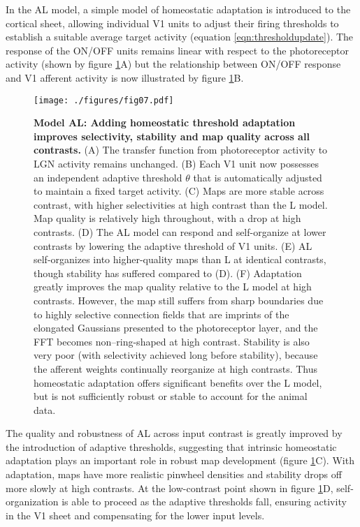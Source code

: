 \documentclass{article}
\def \scalefactor {0.666666}
\def \GaussianScale {\scalefactor}         %
\begin{document}
In the AL model, a simple model of homeostatic adaptation is
introduced to the cortical sheet, allowing individual V1 units to
adjust their firing thresholds to establish a suitable average target
activity (equation \ref{eqn:thresholdupdate}). The response of the
ON/OFF units remains linear with respect to the photoreceptor activity
(shown by figure \ref{fig:gaussian_AL}A) but the relationship between
ON/OFF response and V1 afferent activity is now illustrated by figure
\ref{fig:gaussian_AL}B.
\begin{figure}
\centerline{
\texttt{[image: ./figures/fig07.pdf]}
}

\caption[]{\textbf{Model AL: Adding homeostatic threshold adaptation
    improves selectivity, stability and map quality across all contrasts.} 
  (A) The transfer function from photoreceptor activity to LGN activity
  remains unchanged. (B) Each V1 unit now possesses an independent
  adaptive threshold $\theta$ that is automatically adjusted to
  maintain a fixed target activity. (C) Maps are more stable across
  contrast, with higher selectivities at high contrast than the L
  model. Map quality is relatively high throughout, with a drop at high
  contrasts. (D) The AL model can respond and self-organize at lower
  contrasts by lowering the adaptive threshold of V1 units. (E) AL
  self-organizes into higher-quality maps than L at identical
  contrasts, though stability has suffered compared to (D).  (F)
  Adaptation greatly improves the map quality relative to the L model
  at high contrasts. However, the map still suffers from sharp
  boundaries due to highly selective connection fields that are
  imprints of the elongated Gaussians presented to the photoreceptor
  layer, and the FFT becomes non--ring-shaped at high contrast.
  Stability is also very poor (with selectivity achieved long before
  stability), because the afferent weights continually reorganize at
  high contrasts.  Thus homeostatic adaptation offers significant
  benefits over the L model, but is not sufficiently robust or stable
  to account for the animal data.}
\label{fig:gaussian_AL}
\end{figure}

The quality and robustness of AL across input contrast is greatly
improved by the introduction of adaptive thresholds, suggesting that
intrinsic homeostatic adaptation plays an important role in robust map
development (figure \ref{fig:gaussian_AL}C). With adaptation, maps
have more realistic pinwheel densities and stability drops off more
slowly at high contrasts. At the low-contrast point shown in figure
\ref{fig:gaussian_AL}D, self-organization is able to proceed as the
adaptive thresholds fall, ensuring activity in the V1 sheet and
compensating for the lower input levels.
\end{document}
